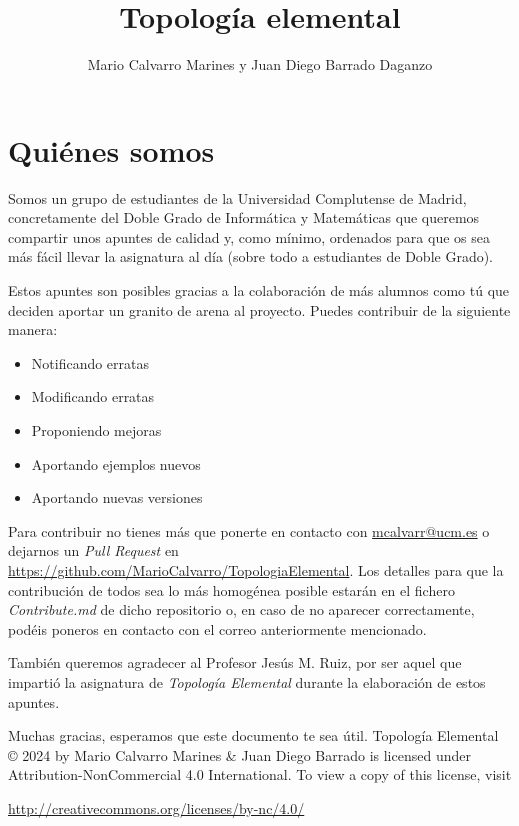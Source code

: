 \documentclass[10pt,a4paper,openright]{book}
\title{\Huge Topología elemental}
\author{Mario Calvarro Marines y Juan Diego Barrado Daganzo}
\date{}
\begin{document}
\frontmatter
\maketitle
\setcounter{tocdepth}{3}%
\tableofcontents
\newpage

\section*{Quiénes somos}
Somos un grupo de estudiantes de la Universidad Complutense de Madrid, concretamente del Doble Grado de Informática y Matemáticas que queremos compartir unos apuntes de calidad y, como mínimo, ordenados para que os sea más fácil llevar la asignatura al día (sobre todo a estudiantes de Doble Grado).

Estos apuntes son posibles gracias a la colaboración de más alumnos como tú que deciden aportar un granito de arena al proyecto. Puedes contribuir de la siguiente manera:
\begin{itemize}
\item Notificando erratas
\item Modificando erratas
\item Proponiendo mejoras
\item Aportando ejemplos nuevos
\item Aportando nuevas versiones
\end{itemize}
Para contribuir no tienes más que ponerte en contacto con
\href{mailto:mcalvarr@ucm.es}{mcalvarr@ucm.es} o dejarnos un \textit{Pull
Request} en \url{https://github.com/MarioCalvarro/TopologiaElemental}. Los detalles para que la contribución de todos sea lo más homogénea posible estarán en el fichero \textit{Contribute.md} de dicho repositorio o, en caso de no aparecer correctamente, podéis poneros en contacto con el correo anteriormente mencionado.

También queremos agradecer al Profesor Jesús M. Ruiz, por ser aquel que impartió
la asignatura de \textit{Topología Elemental} durante la elaboración de estos
apuntes.

Muchas gracias, esperamos que este documento te sea útil.
\vfill
Topología Elemental © 2024 by Mario Calvarro Marines \& Juan Diego Barrado is licensed under Attribution-NonCommercial 4.0 International. To view a copy of this license, visit
\begin{center}
\url{http://creativecommons.org/licenses/by-nc/4.0/}
\end{center}
\end{document}

